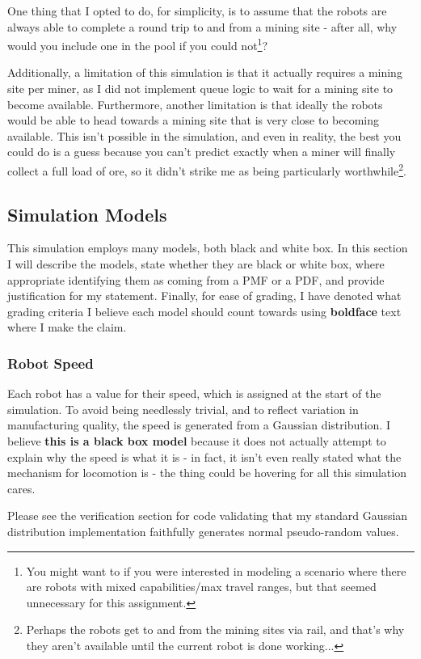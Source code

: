\documentclass{article}
\begin{document}
One thing that I opted to do, for simplicity, is to assume that the robots are always able to complete a round trip to and from a mining site - after all, why would you include one in the pool if you could not\footnote{You might want to if you were interested in modeling a scenario where there are robots with mixed capabilities/max travel ranges, but that seemed unnecessary for this assignment.}?

Additionally, a limitation of this simulation is that it actually requires a mining site per miner, as I did not implement queue logic to wait for a mining site to become available.
Furthermore, another limitation is that ideally the robots would be able to head towards a mining site that is very close to becoming available.
This isn't possible in the simulation, and even in reality, the best you could do is a guess because you can't predict exactly when a miner will finally collect a full load of ore, so it didn't strike me as being particularly worthwhile\footnote{Perhaps the robots get to and from the mining sites via rail, and that's why they aren't available until the current robot is done working...}.

\subsection{Simulation Models}
This simulation employs many models, both black and white box. In this section I will describe the models, state whether they are black or white box, where appropriate identifying them as coming from a PMF or a PDF, and provide justification for my statement. Finally, for ease of grading, I have denoted what grading criteria I believe each model should count towards using \textbf{boldface} text where I make the claim.

\subsubsection{Robot Speed}
Each robot has a value for their speed, which is assigned at the start of the simulation.
To avoid being needlessly trivial, and to reflect variation in manufacturing quality, the speed is generated from a Gaussian distribution.
I believe \textbf{this is a black box model} because it does not actually attempt to explain why the speed is what it is - in fact, it isn't even really stated what the mechanism for locomotion is - the thing could be hovering for all this simulation cares.

Please see the verification section for code validating that my standard Gaussian distribution implementation faithfully generates normal pseudo-random values.
\end{document}
